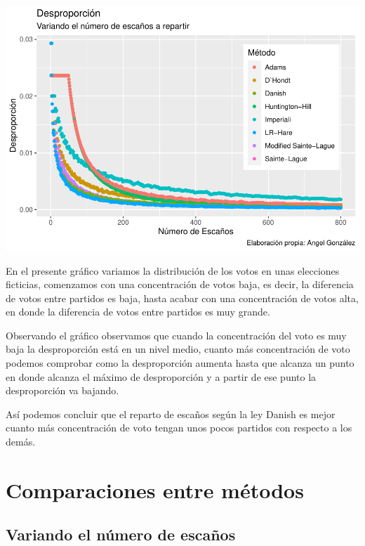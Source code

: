 \documentclass[12pt,a4paper,]{book}
\numberwithin{dummy}{section}
\theoremstyle{ocrenumbox}
\theoremstyle{blacknumex}
\theoremstyle{blacknumbox}
\theoremstyle{ocrenum}
\theoremstyle{ocrenum}
\begin{document}
\begin{center}\includegraphics[width=0.95\linewidth]{figurasR/unnamed-chunk-44-1} \end{center}

En el presente gráfico variamos la distribución de los votos en unas
elecciones ficticias, comenzamos con una concentración de votos baja, es
decir, la diferencia de votos entre partidos es baja, hasta acabar con
una concentración de votos alta, en donde la diferencia de votos entre
partidos es muy grande.

Observando el gráfico observamos que cuando la concentración del voto es
muy baja la desproporción está en un nivel medio, cuanto más
concentración de voto podemos comprobar como la desproporción aumenta
hasta que alcanza un punto en donde alcanza el máximo de desproporción y
a partir de ese punto la desproporción va bajando.

Así podemos concluir que el reparto de escaños según la ley Danish es
mejor cuanto más concentración de voto tengan unos pocos partidos con
respecto a los demás.

\hypertarget{comparaciones-entre-muxe9todos}{%
\section{Comparaciones entre
métodos}\label{comparaciones-entre-muxe9todos}}

\hypertarget{variando-el-nuxfamero-de-escauxf1os}{%
\subsection{Variando el número de
escaños}\label{variando-el-nuxfamero-de-escauxf1os}}
\end{document}
